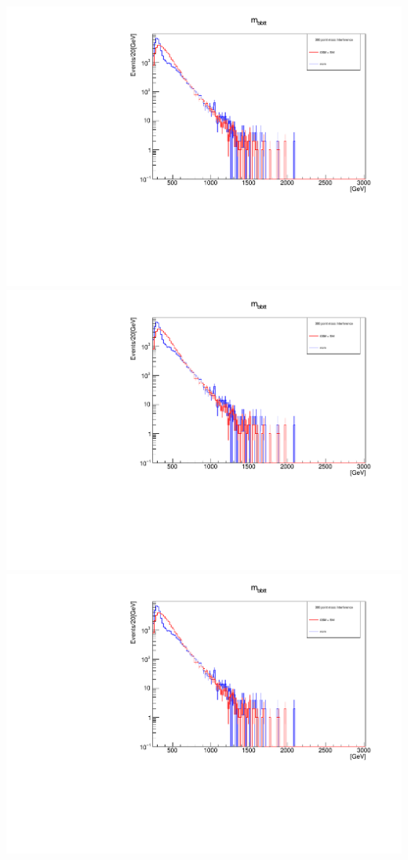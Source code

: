 \documentclass[a4wide,10pt]{article}
\begin{document}
\includegraphics[scale=0.50,page=1]{InterferencePlots30p.pdf}
\includegraphics[scale=0.50,page=2]{InterferencePlots30p.pdf}
\includegraphics[scale=0.50,page=3]{InterferencePlots30p.pdf}
\end{document}
